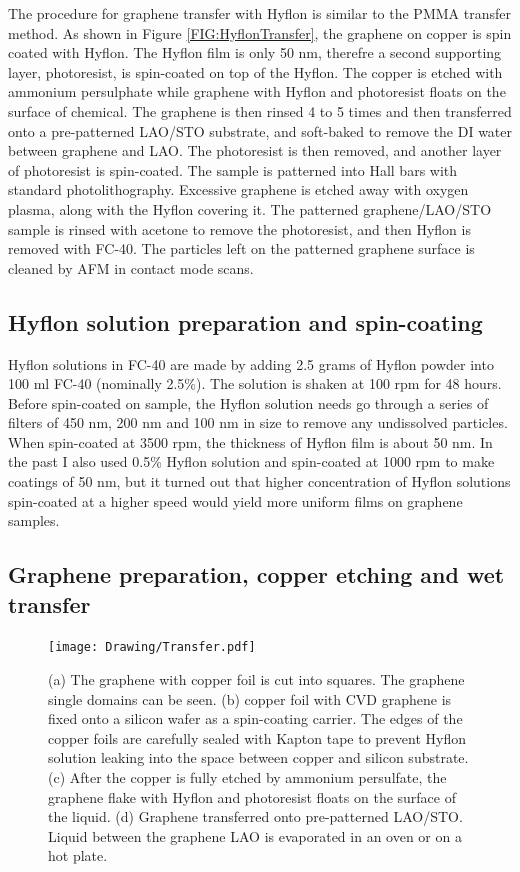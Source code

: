 \documentclass[pdflatex, sectionletters, 12pt]{pittetd}    %
\begin{document}
The procedure for graphene transfer with Hyflon is similar to the PMMA transfer method. As shown in Figure \ref{FIG:HyflonTransfer}, the graphene on copper is spin coated with Hyflon. The Hyflon film is only 50 nm, therefre a second supporting layer, photoresist, is spin-coated on top of the Hyflon. The copper is etched with ammonium persulphate while graphene with Hyflon and photoresist floats on the surface of chemical. The graphene is then rinsed 4 to 5 times and then transferred onto a pre-patterned LAO/STO substrate, and soft-baked to remove the DI water between graphene and LAO. The photoresist is then removed, and another layer of photoresist is spin-coated. The sample is patterned into Hall bars with standard photolithography. Excessive graphene is etched away with oxygen plasma, along with the Hyflon covering it. The patterned graphene/LAO/STO sample is rinsed with acetone to remove the photoresist, and then Hyflon is removed with FC-40. The particles left on the patterned graphene surface is cleaned by AFM in contact mode scans. 

\subsection{Hyflon solution preparation and spin-coating} 


Hyflon solutions in FC-40 are made by adding 2.5 grams of Hyflon powder into 100 ml FC-40 (nominally 2.5\%). The solution is shaken at 100 rpm for 48 hours. Before spin-coated on sample, the Hyflon solution needs go through a series of filters of 450 nm, 200 nm and 100 nm in size to remove any undissolved particles. When spin-coated at 3500 rpm, the thickness of Hyflon film is about 50 nm. In the past I also used 0.5\% Hyflon solution and spin-coated at 1000 rpm to make coatings of 50 nm, but it turned out that higher concentration of Hyflon solutions spin-coated at a higher speed would yield more uniform films on graphene samples. 

\subsection{Graphene preparation, copper etching and wet transfer}

\begin{figure}[p]
	\centering
	\texttt{[image: Drawing/Transfer.pdf]}
	\caption{(a) The graphene with copper foil is cut into squares. The graphene single domains can be seen. (b) copper foil with CVD graphene is fixed onto a silicon wafer as a spin-coating carrier. The edges of the copper foils are carefully sealed with Kapton tape to prevent Hyflon solution leaking into the space between copper and silicon substrate. (c) After the copper is fully etched by ammonium persulfate, the graphene flake with Hyflon and photoresist floats on the surface of the liquid. (d) Graphene transferred onto pre-patterned LAO/STO. Liquid between the graphene LAO is evaporated in an oven or on a hot plate.}
	\label{FIG:Transfer}
\end{figure}
\end{document}

